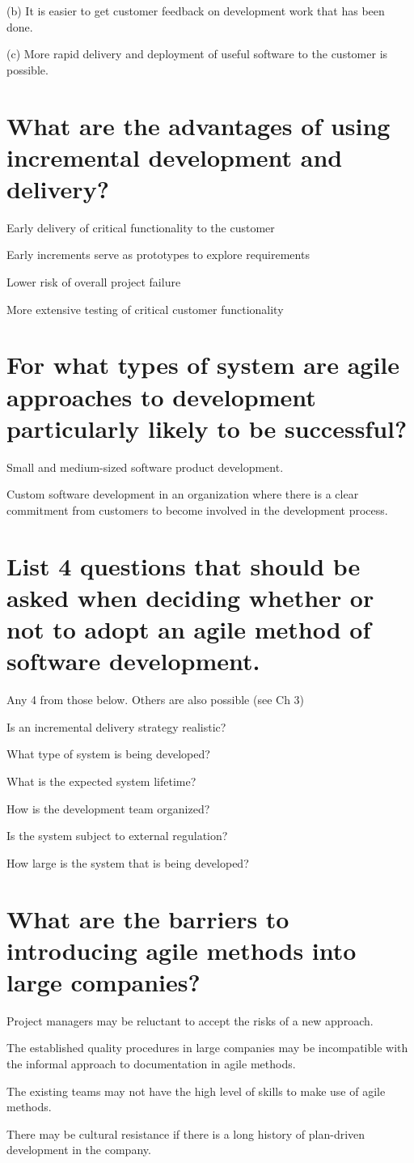 \documentclass{article}
\begin{document}
(b) It is easier to get customer feedback on development work that has been done.

(c) More rapid delivery and deployment of useful software to the customer is possible.

\section{What are the advantages of using incremental development and delivery?}
Early delivery of critical functionality to the customer

Early increments serve as prototypes to explore requirements

Lower risk of overall project failure

More extensive testing of critical customer functionality

\section{For what types of system are agile approaches to development particularly likely to be successful?}
Small and medium-sized software product development.

Custom software development in an organization where there is a clear commitment from customers to become involved in the development process.



\section{List 4 questions that should be asked when deciding whether or not to adopt an agile method of software development.}

\noindent Any 4 from those below. Others are also possible (see Ch 3) \newline

Is an incremental delivery strategy realistic?

What type of system is being developed?

What is the expected system lifetime?

How is the development team organized?

Is the system subject to external regulation?

How large is the system that is being developed?



\section{What are the barriers to introducing agile methods into large companies?}
Project managers may be reluctant to accept the risks of a new approach.

The established quality procedures in large companies may be incompatible with the informal approach to documentation in agile methods.

The existing teams may not have the high level of skills to make use of agile methods.

There may be cultural resistance if there is a long history of plan-driven development in the company.
\end{document}

